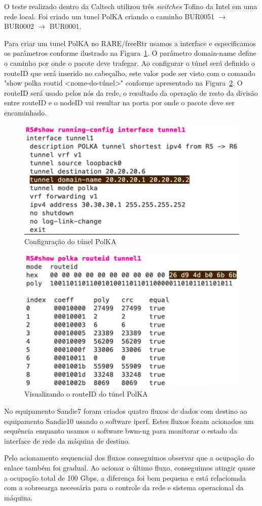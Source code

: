 \documentclass[12pt]{article}
\begin{document}
O teste realizado dentro da Caltech utilizou três \textit{switches} Tofino da Intel em uma rede local. Foi criado um tunel PolKA criando o caminho BUR0051 $\rightarrow$ BUR0002 $\rightarrow$ BUR0001.

Para criar um tunel PolKA no RARE/freeRtr usamos a interface e especificamos os parâmetros conforme ilustrado na Figura~\ref{fig:tunel1}. O parâmetro domain-name define o caminho por onde o pacote deve trafegar. Ao configurar o túnel será definido o routeID que será inserido no cabeçalho, este valor pode ser visto com o comando "show polka routid <nome-do-túnel>" conforme apresentado na Figura~\ref{fig:tunel2}. O routeID será usado pelos nós da rede, o resultado da operação de resto da divisão entre routeID e o nodeID vai resultar na porta por onde o pacote deve ser encaminhado.

\begin{figure}[ht]
\centering
\includegraphics[width=.5\textwidth]{tunel1.png}
\caption{Configuração do túnel PolKA \cite{borges2022lifecycle}}
\label{fig:tunel1}
\end{figure}

\begin{figure}[ht]
\centering
\includegraphics[width=.5\textwidth]{tunel2.png}
\caption{Visualizando o routeID do túnel PolKA \cite{borges2022lifecycle}}
\label{fig:tunel2}
\end{figure}

No equipamento Sandie7 foram criados quatro fluxos de dados com destino ao equipamento Sandie10 usando o software iperf. Estes fluxos foram acionados um sequência enquanto usamos o software bwm-ng para monitorar o estado da interface de rede da máquina de destino.

Pelo acionamento sequencial dos fluxos conseguimos observar que a ocupação do enlace também foi gradual. Ao acionar o último fluxo, conseguimos atingir quase a ocupação total de 100 Gbps, a diferença foi bem pequena e está relacionada com a sobrecarga necessária para o controle da rede e sistema operacional da máquina.
\end{document}
